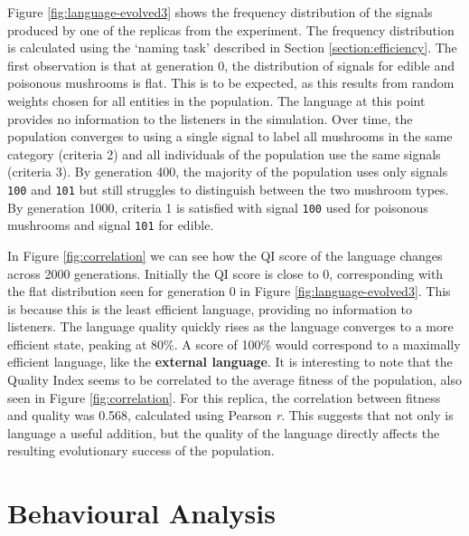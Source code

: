 \documentclass[12pt,a4paper,twoside,openright]{report}
\begin{document}
Figure \ref{fig:language-evolved3} shows the frequency distribution of the signals produced by one of the replicas from the experiment. The frequency distribution is calculated using the `naming task' described in Section \ref{section:efficiency}. The first observation is that at generation 0, the distribution of signals for edible and poisonous mushrooms is flat. This is to be expected, as this results from random weights chosen for all entities in the population. The language at this point provides no information to the listeners in the simulation. Over time, the population converges to using a single signal to label all mushrooms in the same category (criteria 2) and all individuals of the population use the same signals (criteria 3). By generation 400, the majority of the population uses only signals \verb~100~ and \verb~101~ but still struggles to distinguish between the two mushroom types. By generation 1000, criteria 1 is satisfied with signal \verb~100~ used for poisonous mushrooms and signal \verb~101~ for edible. 

In Figure \ref{fig:correlation} we can see how the QI score of the language changes across 2000 generations. Initially the QI score is close to 0, corresponding with the flat distribution seen for generation 0 in Figure \ref{fig:language-evolved3}. This is because this is the least efficient language, providing no information to listeners. The language quality quickly rises as the language converges to a more efficient state, peaking at 80\%. A score of 100\% would correspond to a maximally efficient language, like the {\bf external language}. It is interesting to note that the Quality Index seems to be correlated to the average fitness of the population, also seen in Figure \ref{fig:correlation}. For this replica, the correlation between fitness and quality was 0.568, calculated using Pearson \emph{r}. This suggests that not only is language a useful addition, but the quality of the language directly affects the resulting evolutionary success of the population.


\section{Behavioural Analysis}\label{section:behaviouranalysis}
\end{document}
